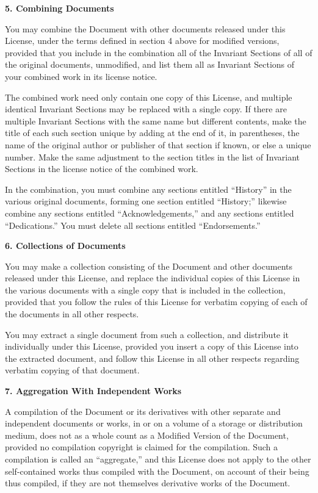 \documentclass{doc}
\begin{document}
\noindent\textbf{5. Combining Documents}

You may combine the Document with other documents released under this
License, under the terms defined in section 4 above for modified
versions, provided that you include in the combination all of the
Invariant Sections of all of the original documents, unmodified, and
list them all as Invariant Sections of your combined work in its
license notice.

The combined work need only contain one copy of this License, and
multiple identical Invariant Sections may be replaced with a single
copy.  If there are multiple Invariant Sections with the same name but
different contents, make the title of each such section unique by
adding at the end of it, in parentheses, the name of the original
author or publisher of that section if known, or else a unique number.
Make the same adjustment to the section titles in the list of
Invariant Sections in the license notice of the combined work.

In the combination, you must combine any sections entitled ``History''
in the various original documents, forming one section entitled
``History;'' likewise combine any sections entitled ``Acknowledgements,''
and any sections entitled ``Dedications.''  You must delete all sections
entitled ``Endorsements.''


\noindent\textbf{6. Collections of Documents}

You may make a collection consisting of the Document and other documents
released under this License, and replace the individual copies of this
License in the various documents with a single copy that is included in
the collection, provided that you follow the rules of this License for
verbatim copying of each of the documents in all other respects.

You may extract a single document from such a collection, and distribute
it individually under this License, provided you insert a copy of this
License into the extracted document, and follow this License in all
other respects regarding verbatim copying of that document.



\noindent\textbf{7. Aggregation With Independent Works}

A compilation of the Document or its derivatives with other separate
and independent documents or works, in or on a volume of a storage or
distribution medium, does not as a whole count as a Modified Version
of the Document, provided no compilation copyright is claimed for the
compilation.  Such a compilation is called an ``aggregate,'' and this
License does not apply to the other self-contained works thus compiled
with the Document, on account of their being thus compiled, if they
are not themselves derivative works of the Document.
\end{document}
